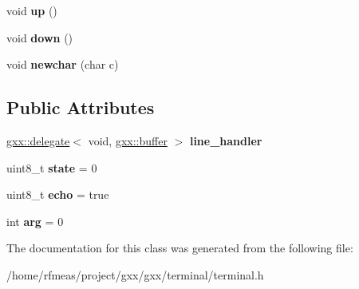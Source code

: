 \begin{DoxyCompactItemize}
\item 
void {\bfseries up} ()\hypertarget{classgxx_1_1terminal__core_af076ecc6a0b86cd29df16eac80698921}{}\label{classgxx_1_1terminal__core_af076ecc6a0b86cd29df16eac80698921}

\item 
void {\bfseries down} ()\hypertarget{classgxx_1_1terminal__core_a066db769952939d10fb6227f36919ea4}{}\label{classgxx_1_1terminal__core_a066db769952939d10fb6227f36919ea4}

\item 
void {\bfseries newchar} (char c)\hypertarget{classgxx_1_1terminal__core_a2ddf5d201dfe6ce3ebe1a11d836a2532}{}\label{classgxx_1_1terminal__core_a2ddf5d201dfe6ce3ebe1a11d836a2532}

\end{DoxyCompactItemize}
\subsection*{Public Attributes}
\begin{DoxyCompactItemize}
\item 
\hyperlink{classgxx_1_1delegate}{gxx\+::delegate}$<$ void, \hyperlink{classgxx_1_1buffer}{gxx\+::buffer} $>$ {\bfseries line\+\_\+handler}\hypertarget{classgxx_1_1terminal__core_a6010d235dfa06dcbd9f9a5e6d4bf75d5}{}\label{classgxx_1_1terminal__core_a6010d235dfa06dcbd9f9a5e6d4bf75d5}

\item 
uint8\+\_\+t {\bfseries state} = 0\hypertarget{classgxx_1_1terminal__core_acdefbea253ae4ed94a4ae7035436eac9}{}\label{classgxx_1_1terminal__core_acdefbea253ae4ed94a4ae7035436eac9}

\item 
uint8\+\_\+t {\bfseries echo} = true\hypertarget{classgxx_1_1terminal__core_acff3106e618349fea0809e7cbce831f9}{}\label{classgxx_1_1terminal__core_acff3106e618349fea0809e7cbce831f9}

\item 
int {\bfseries arg} = 0\hypertarget{classgxx_1_1terminal__core_ad2060570ce7e5ba07135457a423c80ab}{}\label{classgxx_1_1terminal__core_ad2060570ce7e5ba07135457a423c80ab}

\end{DoxyCompactItemize}


The documentation for this class was generated from the following file\+:\begin{DoxyCompactItemize}
\item 
/home/rfmeas/project/gxx/gxx/terminal/terminal.\+h\end{DoxyCompactItemize}
